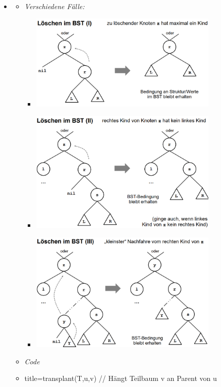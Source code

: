 \documentclass[
    12pt,
    a4paper,
    ngerman,
    color=3b,%
    marginpar=false,
    colorback=false,
    leqno,
]{tudaexercise}
\begin{document}
\begin{itemize}
    \item {}
          \begin{itemize}
              \item \textit{Verschiedene Fälle:}
                    \begin{itemize}
                        \item[] \includegraphics[width=9cm]{pictures/binärerSuchbaumLöschen1.PNG}
                        \item[] \includegraphics[width=9cm]{pictures/binärerSuchbaumLöschen2.PNG}
                        \item[] \includegraphics[width=9cm]{pictures/binärerSuchbaumLöschen3.PNG}
                    \end{itemize}
                    \clearpage
              \item \textit{Code}
              \item[]
                        \begin{codeBlock}[autogobble]{title={transplant(T,u,v) // Hängt Teilbaum v an Parent von u}}

\end{codeBlock}
\end{itemize}
\end{itemize}
\end{document}
